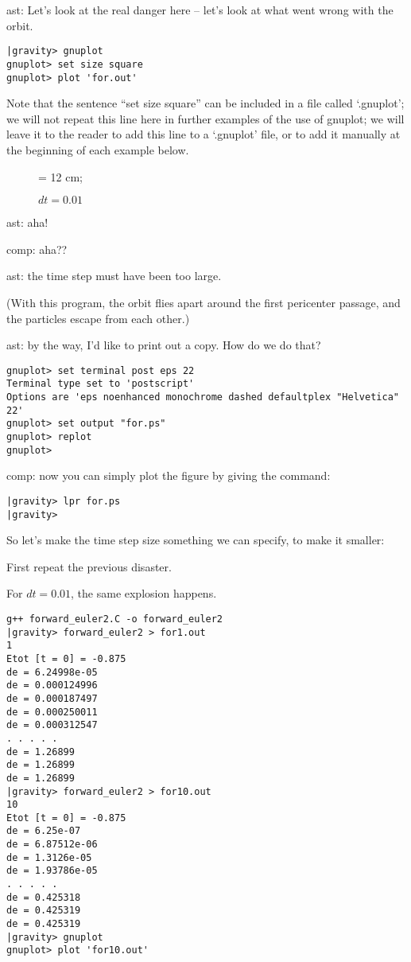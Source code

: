 ast: Let's look at the real danger here -- let's look at what went
wrong with the orbit.

\begin{verbatim}
|gravity> gnuplot
gnuplot> set size square
gnuplot> plot 'for.out'
\end{verbatim}

Note that the sentence ``set size square'' can be included in a file
called `.gnuplot'; we will not repeat this line here in further
examples of the use of gnuplot; we will leave it to the reader to add
this line to a `.gnuplot' file, or to add it manually at the beginning
of each example below.

\begin{figure}
\begin{center}
\leavevmode
\epsfxsize = 12 cm;
\caption{$dt = 0.01$}
\label{fig:for}
\end{center}
\end{figure}

ast: aha!

comp: aha??

ast: the time step must have been too large.

(With this program, the orbit flies apart around the first pericenter
passage, and the particles escape from each other.)

ast: by the way, I'd like to print out a copy.  How do we do that?

\begin{verbatim}
gnuplot> set terminal post eps 22
Terminal type set to 'postscript'
Options are 'eps noenhanced monochrome dashed defaultplex "Helvetica" 22'
gnuplot> set output "for.ps"
gnuplot> replot
gnuplot> 
\end{verbatim}

comp: now you can simply plot the figure by giving the command:

\begin{verbatim}
|gravity> lpr for.ps
|gravity>
\end{verbatim}

So let's make the time step size something we can specify, to make it
smaller:



First repeat the previous disaster.

For $dt = 0.01$, the same explosion happens.

\begin{verbatim}
g++ forward_euler2.C -o forward_euler2
|gravity> forward_euler2 > for1.out
1
Etot [t = 0] = -0.875
de = 6.24998e-05
de = 0.000124996
de = 0.000187497
de = 0.000250011
de = 0.000312547
. . . . .
de = 1.26899
de = 1.26899
de = 1.26899
|gravity> forward_euler2 > for10.out
10
Etot [t = 0] = -0.875
de = 6.25e-07
de = 6.87512e-06
de = 1.3126e-05
de = 1.93786e-05
. . . . .
de = 0.425318
de = 0.425319
de = 0.425319
|gravity> gnuplot
gnuplot> plot 'for10.out'
\end{verbatim}

